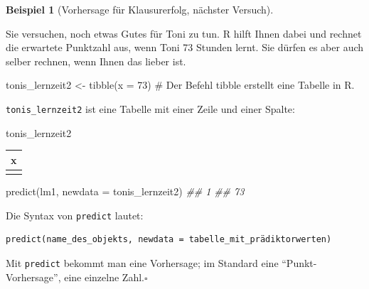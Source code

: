 \documentclass[
  letterpaper,
]{scrbook}
\newenvironment{Shaded}{\begin{snugshade}}{\end{snugshade}}
\newcommand{\AttributeTok}[1]{\textcolor[rgb]{0.40,0.45,0.13}{#1}}
\newcommand{\CommentTok}[1]{\textcolor[rgb]{0.37,0.37,0.37}{#1}}
\newcommand{\DecValTok}[1]{\textcolor[rgb]{0.68,0.00,0.00}{#1}}
\newcommand{\DocumentationTok}[1]{\textcolor[rgb]{0.37,0.37,0.37}{\textit{#1}}}
\newcommand{\FunctionTok}[1]{\textcolor[rgb]{0.28,0.35,0.67}{#1}}
\newcommand{\NormalTok}[1]{\textcolor[rgb]{0.00,0.23,0.31}{#1}}
\newcommand{\OtherTok}[1]{\textcolor[rgb]{0.00,0.23,0.31}{#1}}
\theoremstyle{definition}
\newtheorem{example}{Beispiel}[chapter]
\theoremstyle{definition}
\theoremstyle{definition}
\theoremstyle{remark}
\begin{document}
\begin{example}[Vorhersage für Klausurerfolg, nächster
Versuch]\protect\hypertarget{exm-noten6}{}\label{exm-noten6}

Sie versuchen, noch etwas Gutes für Toni zu tun. R hilft Ihnen dabei und
rechnet die erwartete Punktzahl aus, wenn Toni 73 Stunden lernt. Sie
dürfen es aber auch selber rechnen, wenn Ihnen das lieber ist.

\end{example}

\begin{Shaded}
\begin{Highlighting}[]
\NormalTok{tonis\_lernzeit2 }\OtherTok{\textless{}{-}} \FunctionTok{tibble}\NormalTok{(}\AttributeTok{x =} \DecValTok{73}\NormalTok{)  }\CommentTok{\# Der Befehl \textasciigrave{}tibble\textasciigrave{} erstellt eine Tabelle in R.}
\end{Highlighting}
\end{Shaded}

\texttt{tonis\_lernzeit2} ist eine Tabelle mit einer Zeile und einer
Spalte:

\begin{Shaded}
\begin{Highlighting}[]
\NormalTok{tonis\_lernzeit2}
\end{Highlighting}
\end{Shaded}

\begin{longtable}[]{@{}r@{}}
\toprule\noalign{}
x \\
\midrule\noalign{}
\endhead
\bottomrule\noalign{}
\endlastfoot
73 \\
\end{longtable}

\begin{Shaded}
\begin{Highlighting}[]
\FunctionTok{predict}\NormalTok{(lm1, }\AttributeTok{newdata =}\NormalTok{ tonis\_lernzeit2)}
\DocumentationTok{\#\#  1 }
\DocumentationTok{\#\# 73}
\end{Highlighting}
\end{Shaded}

Die Syntax von \texttt{predict} lautet:

\begin{verbatim}
predict(name_des_objekts, newdata = tabelle_mit_prädiktorwerten)
\end{verbatim}

\begin{tcolorbox}[enhanced jigsaw, left=2mm, toptitle=1mm, toprule=.15mm, rightrule=.15mm, leftrule=.75mm, breakable, colbacktitle=quarto-callout-note-color!10!white, colback=white, coltitle=black, bottomtitle=1mm, opacityback=0, title=\textcolor{quarto-callout-note-color}{\faInfo}\hspace{0.5em}{Hinweis}, colframe=quarto-callout-note-color-frame, arc=.35mm, opacitybacktitle=0.6, bottomrule=.15mm, titlerule=0mm]

Mit \texttt{predict} bekommt man eine Vorhersage; im Standard eine
``Punkt-Vorhersage'', eine einzelne Zahl.\(\square\)

\end{tcolorbox}
\end{document}
